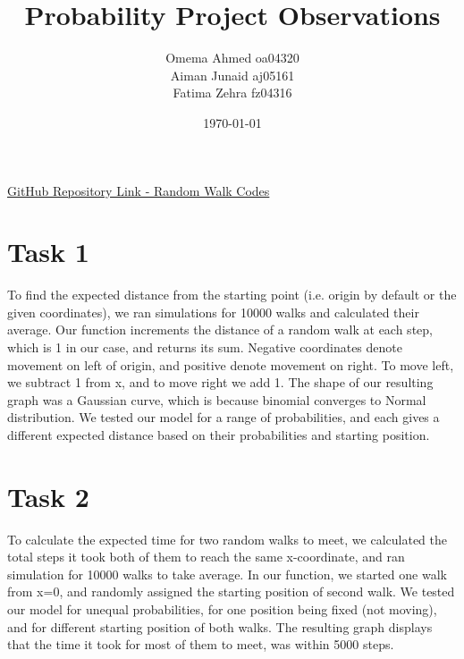 \documentclass{article}
\title{Probability Project Observations}
\author{Omema Ahmed oa04320 \\ Aiman Junaid aj05161 \\ Fatima Zehra fz04316}
\date{\today}
\begin{document}
    \maketitle
    \begin{center}
        \href{https://github.com/habib-university/Probability-Project---Random-Walk}{GitHub Repository Link - Random Walk Codes}
    \end{center}
    \section*{Task 1}
    To find the expected distance from the starting point (i.e. origin by default or the given coordinates), we ran simulations for 10000 walks and calculated their average.
    Our function increments the distance of a random walk at each step, which is 1 in our case, and returns its sum. Negative coordinates denote movement on left of origin, 
    and positive denote movement on right. To move left, we subtract 1 from x, and to move right we add 1.
    The shape of our resulting graph was a Gaussian curve, which is because binomial converges to Normal distribution. %
    We tested our model for a range of probabilities, and each gives a different expected distance based on their probabilities and starting position.

    \section*{Task 2}
    To calculate the expected time for two random walks to meet, we calculated the total steps it took both of them to reach the same x-coordinate, and ran simulation for 10000 walks to take average.
    In our function, we started one walk from x=0, and randomly assigned the starting position of second walk. We tested our model for unequal probabilities, for one position being fixed (not moving), 
    and for different starting position of both walks.
    The resulting graph displays that the time it took for most of them to meet, was within 5000 steps.
    
\end{document}
